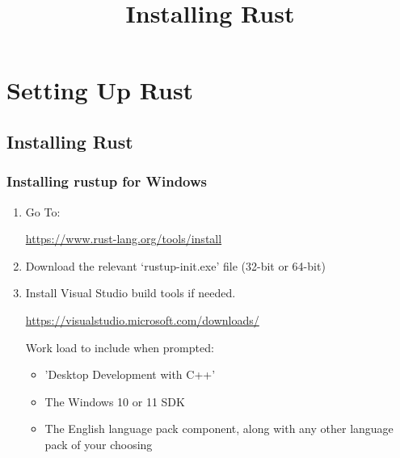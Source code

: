 \documentclass{beamer}
\title{Installing Rust}
\begin{document}
\begin{frame}
  \titlepage{}
\end{frame}

\section{Setting Up Rust}
\subsection{Installing Rust}
\begin{frame}
  \frametitle{Installing rustup for Windows}
  \begin{enumerate}
    \item{Go To:

          \url{https://www.rust-lang.org/tools/install}}
    \pause{}
    \item{Download the relevant `rustup-init.exe' file (32-bit or 64-bit)}
    \pause{}
    \item{Install Visual Studio build tools if needed.

          \url{https://visualstudio.microsoft.com/downloads/}

          Work load to include when prompted:
          \begin{itemize}
            \item{'Desktop Development with C++'}
            \item{The Windows 10 or 11 SDK}
            \item{The English language pack component, along with any other language pack of your choosing}
          \end{itemize}
          }
  \end{enumerate}
\end{frame}
\end{document}
